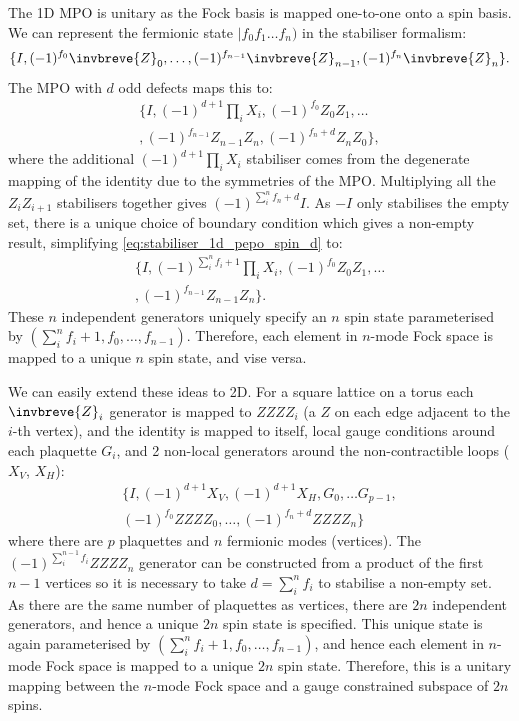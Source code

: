 \documentclass[aps,prl,twocolumn,floatfix,10pt,amssymb,amsfont,amsmath,superscriptaddress,float,nofootinbib,longbibliography,nobalancelastpage]{revtex4-2}
\begin{document}
The 1D MPO is unitary as the Fock basis is mapped one-to-one onto a spin basis. We can represent the fermionic state $|f_0f_1\ldots f_n)$ in the stabiliser formalism:
\begin{equation}
    \{I, (-1)^{f_0} \invbreve{Z}_0, \ldots, (-1)^{f_{n-1}}\invbreve{Z}_{n-1}, (-1)^{f_n}\invbreve{Z}_{n}\}.
\end{equation}
The MPO with $d$ odd defects maps this to:
\begin{multline}
    \{I, (-1)^{d+1}\textstyle{\prod_i X_i}, (-1)^{f_0} Z_0Z_1, \ldots\\, (-1)^{f_{n-1}}Z_{n-1}Z_{n}, (-1)^{f_n+d}Z_{n}Z_0\},
    \label{eq:stabiliser_1d_pepo_spin_d}
\end{multline}
where the additional $(-1)^{d+1}\prod_i X_i$ stabiliser comes from the degenerate mapping of the identity due to the symmetries of the MPO. Multiplying all the $Z_{i}Z_{i+1}$ stabilisers together gives $(-1)^{\sum_i^n f_n + d}I$. As $-I$ only stabilises the empty set, there is a unique choice of boundary condition which gives a non-empty result, simplifying \eqref{eq:stabiliser_1d_pepo_spin_d} to:
\begin{multline}
    \{I, (-1)^{\sum_{i}^{n}f_i+1}\textstyle{\prod_i X_i}, (-1)^{f_0} Z_0Z_1, \ldots\\, (-1)^{f_{n-1}}Z_{n-1}Z_{n}\}.
    \label{eq:stabiliser_1d_pepo_spin}
\end{multline}
These $n$ independent generators uniquely specify an $n$ spin state parameterised by $(\sum_{i}^{n}f_i+1, f_0,\ldots, f_{n-1})$. Therefore, each element in $n$-mode Fock space is mapped to a unique $n$ spin state, and vise versa.

We can easily extend these ideas to 2D. For a square lattice on a torus each $\invbreve{Z}_i$ generator is mapped to $ZZZZ_i$ (a $Z$ on each edge adjacent to the $i$-th vertex), and the identity is mapped to itself, local gauge conditions around each plaquette $G_i$, and 2 non-local generators around the non-contractible loops ($X_V$, $X_H$):
\begin{multline}
    \{I, (-1)^{d+1}X_V, (-1)^{d+1}X_H,G_0,\ldots G_{p-1},\\ (-1)^{f_0} ZZZZ_0, \ldots,  (-1)^{f_n+d} ZZZZ_{n}\}
    \label{eq:stabiliser_2d_pepo_spin_d}
\end{multline}
where there are $p$ plaquettes and $n$ fermionic modes (vertices). The $(-1)^{\sum_{i}^{n-1}f_i}ZZZZ_n$ generator can be constructed from a product of the first $n-1$ vertices so it is necessary to take $d = \sum_{i}^{n}f_i$ to stabilise a non-empty set. As there are the same number of plaquettes as vertices, there are $2n$ independent generators, and hence a unique $2n$ spin state is specified. This unique state is again parameterised by $(\sum_{i}^{n}f_i+1, f_0,\ldots, f_{n-1})$, and hence each element in $n$-mode Fock space is mapped to a unique $2n$ spin state. Therefore, this is a unitary mapping between the $n$-mode Fock space and a gauge constrained subspace of $2n$ spins.
\end{document}
